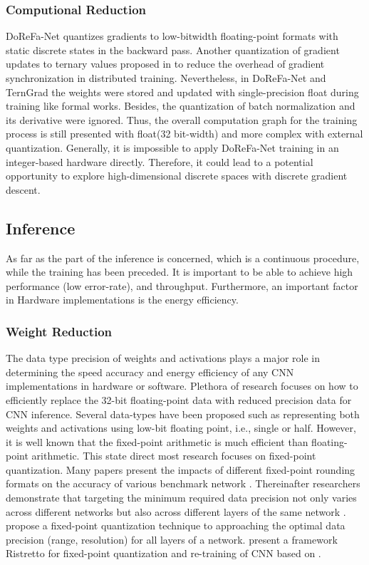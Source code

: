\subsubsection{Computional Reduction}
DoReFa-Net  \cite{Reference14} quantizes  gradients to low-bitwidth floating-point formats with static discrete states in the backward pass.  Another quantization of gradient updates to ternary values proposed in \cite{Reference13} to reduce the overhead of gradient synchronization in distributed training. Nevertheless, in DoReFa-Net and TernGrad  the weights were stored and updated with single-precision float during training like formal works. Besides, the quantization of batch normalization and its derivative were ignored. Thus, the overall computation graph for the training process is still presented with float(32 bit-width) and more complex with external quantization. Generally, it is impossible to apply DoReFa-Net training in an integer-based hardware directly. Therefore, it could lead to a potential opportunity to explore high-dimensional discrete spaces with discrete gradient descent.

\subsection{Inference}
As far as the part of the inference is concerned, which is a continuous procedure, while the training has been preceded. It is important to be able to achieve high performance (low error-rate), and throughput. Furthermore, an important factor in Hardware implementations is the energy efficiency.

\subsubsection{Weight Reduction}
The data type precision of weights and activations plays a major role in determining the speed accuracy and energy efficiency of any CNN implementations in hardware or software. Plethora of research focuses on how to efficiently replace the  32-bit floating-point data with reduced precision data for CNN inference. Several data-types have been proposed such as \cite{Reference15} representing both weights and activations using low-bit floating point, i.e., single or half. However, it is well known that the fixed-point arithmetic is much efficient than floating-point arithmetic. This state direct most research focuses on fixed-point quantization. Many papers present the impacts of different fixed-point rounding formats on the accuracy of various benchmark network \cite{Reference16}. Thereinafter researchers demonstrate that targeting the minimum required data precision not only varies across different networks but also across different layers of the same network \cite{Reference17}. \cite{Reference18} propose a fixed-point quantization technique to approaching the optimal data precision (range, resolution) for all layers of a network.   \cite{Reference19} present a framework Ristretto for fixed-point quantization and re-training of CNN based on \cite{Reference20}.


